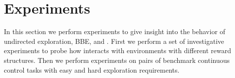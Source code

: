 

\section{Experiments}

In this section we perform experiments to give insight into the behavior of undirected exploration, BBE, and \algshort{}.
First we perform a set of investigative experiments to probe how \algshort{} interacts with environments with different reward structures.
Then we perform experiments on pairs of benchmark continuous control tasks with easy and hard exploration requirements.

